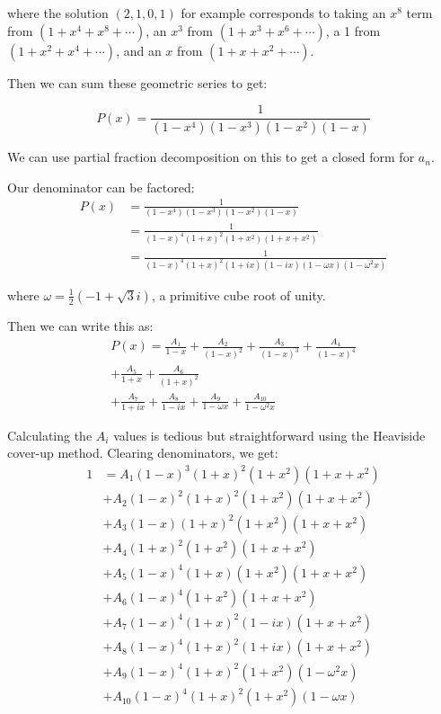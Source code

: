 \documentclass{article}
\begin{document}
where the solution $(2,1,0,1)$ for example corresponds to taking an $x^8$ term from
$(1+x^4+x^8+\cdots)$, an $x^3$ from $(1+x^3+x^6+\cdots)$, a 1 from $(1+x^2+x^4+\cdots)$,
and an $x$ from $(1+x+x^2+\cdots)$.

Then we can sum these geometric series to get:

\[P(x) = \frac{1}{(1-x^4)(1-x^3)(1-x^2)(1-x)} \]

We can use partial fraction decomposition on this to get a closed form for $a_n$.

Our denominator can be factored:
\begin{align*}
 P(x) &= \frac{1}{(1-x^4)(1-x^3)(1-x^2)(1-x)} \\
      &= \frac{1}{(1-x)^4(1+x)^2(1+x^2)(1+x+x^2)} \\
      &= \frac{1}{(1-x)^4(1+x)^2(1+ix)(1-ix)(1-\omega x)(1 - \omega^2 x)}
\end{align*}

where $\omega = \frac{1}{2}(-1+\sqrt{3}i)$, a primitive cube root of unity.

Then we can write this as:
\begin{multline*}
    P(x) = \frac{A_1}{1 - x} + \frac{A_2}{(1 - x)^2} + \frac{A_3}{(1 - x)^3} + \frac{A_4}{(1 - x)^4} \\
    + \frac{A_5}{1 + x} + \frac{A_6}{(1 + x)^2} \\
    + \frac{A_7}{1 + ix} + \frac{A_8}{1 - ix} + \frac{A_9}{1 - \omega x} + \frac{A_{10}}{1 - \omega^2 x}
\end{multline*}

Calculating the $A_i$ values is tedious but straightforward using the Heaviside cover-up
method. Clearing denominators, we get:
\begin{align*}
	1 &= A_1(1-x)^3(1+x)^2(1+x^2)(1+x+x^2) \\
	&+ A_2(1-x)^2(1+x)^2(1+x^2)(1+x+x^2) \\
	&+ A_3(1-x)(1+x)^2(1+x^2)(1+x+x^2) \\
	&+ A_4(1+x)^2(1+x^2)(1+x+x^2) \\
    	&+ A_5(1-x)^4(1+x)(1+x^2)(1+x+x^2) \\
	&+ A_6(1-x)^4(1+x^2)(1+x+x^2) \\
   	&+ A_7(1-x)^4(1+x)^2(1-ix)(1+x+x^2) \\
	&+ A_8(1-x)^4(1+x)^2(1+ix)(1+x+x^2) \\
    	&+ A_9(1-x)^4(1+x)^2(1+x^2)(1-\omega^2 x) \\
	&+ A_{10}(1-x)^4(1+x)^2(1+x^2)(1 - \omega x)
\end{align*}
\end{document}
